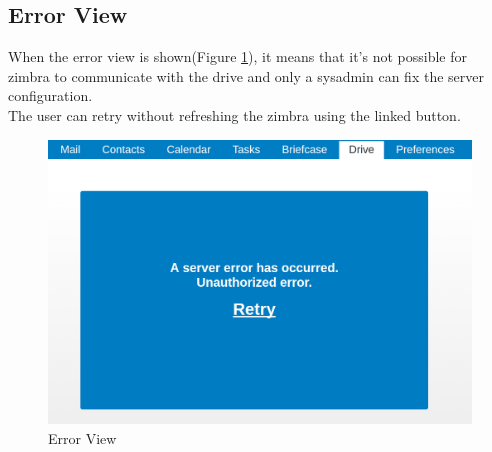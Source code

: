 \subsection{Error View}
When the error view is shown(Figure \ref{==fig:errUnreachable==}), it means that it's not possible for zimbra to communicate with the drive and
only a sysadmin can fix the server configuration.\\
The user can retry without refreshing the zimbra using the linked button.
\begin{figure}[htbp,!h] 
\centering 
\includegraphics[scale=0.18]{src/images/ZD-errorUnreachable.png} 
\caption{Error View} 
\label{==fig:errUnreachable==}
\end{figure}
